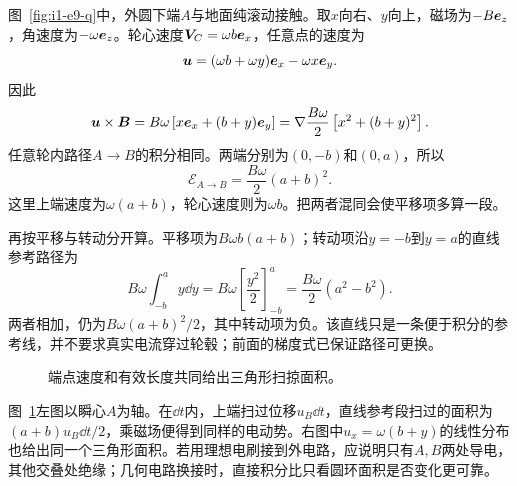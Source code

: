 \begin{solution}
图~\ref{fig:i1-e9-q}中，外圆下端$A$与地面纯滚动接触。取$x$向右、$y$向上，磁场为$-B\bm{e}_z$，角速度为$-\omega\bm{e}_z$。轮心速度$\bm{V}_C=\omega b\bm{e}_x$，任意点的速度为
\[\bm{u}=(\omega b+\omega y)\bm{e}_x-\omega x\bm{e}_y.
\]
因此
\[\bm{u}\times\bm{B}
=B\omega\left[x\bm{e}_x+(b+y)\bm{e}_y\right]
=\nabla\frac{B\omega}{2}\left[x^2+(b+y)^2\right].
\]
任意轮内路径$A\to B$的积分相同。两端分别为$(0,-b)$和$(0,a)$，所以
\[\boxed{\mathcal E_{A\to B}=\frac{B\omega}{2}(a+b)^2}.
\]
这里上端速度为$\omega(a+b)$，轮心速度则为$\omega b$。把两者混同会使平移项多算一段。

再按平移与转动分开算。平移项为$B\omega b(a+b)$；转动项沿$y=-b$到$y=a$的直线参考路径为
\[B\omega\int_{-b}^{a}y\dd y
=B\omega\left[\frac{y^2}{2}\right]_{-b}^{a}
=\frac{B\omega}{2}(a^2-b^2).
\]
两者相加，仍为$B\omega(a+b)^2/2$，其中转动项为负。该直线只是一条便于积分的参考线，并不要求真实电流穿过轮毂；前面的梯度式已保证路径可更换。


\begin{figure}[H]\centering
{}
\caption{端点速度和有效长度共同给出三角形扫掠面积。}\label{fig:i1-e9-s}
\end{figure}

图~\ref{fig:i1-e9-s}左图以瞬心$A$为轴。在$\dd t$内，上端扫过位移$u_B\dd t$，直线参考段扫过的面积为$(a+b)u_B\dd t/2$，乘磁场便得到同样的电动势。右图中$u_x=\omega(b+y)$的线性分布也给出同一个三角形面积。若用理想电刷接到外电路，应说明只有$A,B$两处导电，其他交叠处绝缘；几何电路换接时，直接积分比只看圆环面积是否变化更可靠。
\end{solution}

